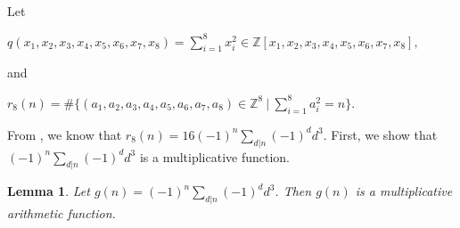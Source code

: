 \documentclass[preprint,12pt]{elsarticle}
\newtheorem{lemma}{Lemma}[section]
\numberwithin{equation}{section}
\begin{document}
\noindent Let
\begin{center}
	$	q(x_{1},x_{2},x_{3},x_{4},x_{5},x_{6},x_{7},x_{8})=\sum\limits_{i=1}^{8}x_{i}^{2}\in \mathbb{Z}[x_{1},x_{2},x_{3},x_{4},x_{5},x_{6},x_{7},x_{8}],$
\end{center} 
and
\begin{center}
	$r_{8}(n)=\#\{(a_{1},a_{2},a_{3},a_{4},a_{5},a_{6},a_{7},a_{8})\in \mathbb{Z}^{8}~|~ \sum_{i=1}^{8} a_{i}^{2}=n\}. $
\end{center}
From \cite{Jacobi}, we know that $r_{8}(n)=16(-1)^{n}\sum_{d|n}(-1)^{d}d^{3}$. First, we show that $(-1)^{n}\sum_{d|n}(-1)^{d}d^{3}$ is a multiplicative function.
\begin{lemma}
	Let $g(n)=(-1)^{n}\sum_{d|n}(-1)^{d}d^{3}$. Then $g(n)$ is a multiplicative arithmetic function.
\end{lemma}
\end{document}
